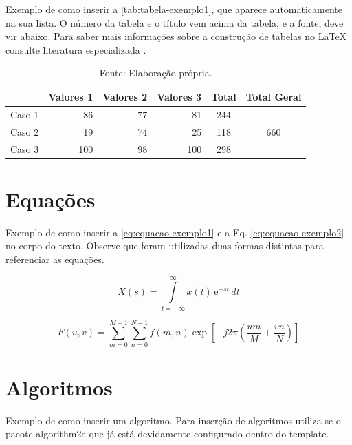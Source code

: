 Exemplo de como inserir a \autoref{tab:tabela-exemplo1}, que aparece automaticamente na sua lista. O número da tabela e o título vem acima da tabela, e a fonte, deve vir abaixo. Para saber mais informações sobre a construção de tabelas no \LaTeX{} consulte literatura especializada \cite{MITTELBACH_2004}.

\begin{table}[!htb]
    \centering
    \caption{Tabela exemplo.}
    \label{tab:tabela-exemplo1}
    \begin{tabular}{l|rrr|c|c}
        & Valores 1 & Valores 2 & Valores 3 & Total & Total Geral \\ \hline
        Caso 1 &  86 &  77 &  81 & 244 & \multirow{3}{*}{660}\\
        Caso 2 &  19 &  74 &  25 & 118 & \\
        Caso 3 & 100 &  98 & 100 & 298 & \\
    \end{tabular}
    \vspace{0.5pt}\caption*{Fonte: Elaboração própria.}
\end{table}

\section{Equações}
\label{sec:equacoes}

Exemplo de como inserir a \autoref{eq:equacao-exemplo1} e a Eq. \ref{eq:equacao-exemplo2} no corpo do texto. Observe que foram utilizadas duas formas distintas para referenciar as equações.

\begin{equation}
    X(s) = \int\limits_{t = -\infty}^{\infty} x(t) \, \text{e}^{-st} \, dt
    \label{eq:equacao-exemplo1}
\end{equation}

\begin{equation}
    F(u, v) = \sum_{m = 0}^{M - 1} \sum_{n = 0}^{N - 1} f(m, n) \exp \left[ -j 2 \pi \left( \frac{u m}{M} + \frac{v n}{N} \right) \right]
    \label{eq:equacao-exemplo2}
\end{equation}

\section{Algoritmos}
\label{sec:algoritmos}

Exemplo de como inserir um algoritmo. Para inserção de algoritmos utiliza-se o pacote {\ttfamily algorithm2e} que já está devidamente configurado dentro do template. 

